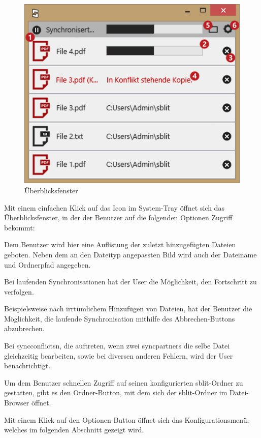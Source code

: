 \begin{figure}[H]
	\centering
	\includegraphics[scale=0.7]{images/ueberblicksfenster.png}
  \caption{Überblicksfenster}
	\label{ueberblicksfenster}
\end{figure}

Mit einem einfachen Klick auf das Icon im System-Tray öffnet sich das Überblicksfenster, in der der
Benutzer auf die folgenden Optionen Zugriff bekommt:

\begin{description}

		Dem Benutzer wird hier eine Auflistung der zuletzt hinzugefügten Dateien
		geboten. Neben dem an den Dateityp angepassten Bild wird auch der Dateiname
		und Ordnerpfad angegeben.

		Bei laufenden Synchronisationen hat der User die Möglichkeit, den
		Fortschritt zu verfolgen.

	  Beispielsweise nach irrtümlichem Hinzufügen von Dateien, hat der Benutzer die
		Möglichkeit, die laufende Synchronisation mithilfe des Abbrechen-Buttons
		abzubrechen.

		Bei \glspl{syncconflict}n, die auftreten, wenn zwei \glspl{syncpartner} die
		selbe Datei gleichzeitig bearbeiten, sowie bei diversen anderen Fehlern,
		wird der User benachrichtigt.

		Um dem Benutzer schnellen Zugriff auf seinen konfigurierten sblit-Ordner zu
		gestatten, gibt es den Ordner-Button, mit dem sich der sblit-Ordner im
		Datei-Browser öffnet.

		Mit einem Klick auf den Optionen-Button öffnet sich das Konfigurationsmenü,
		welches im folgenden Abschnitt gezeigt wird.
\end{description}
